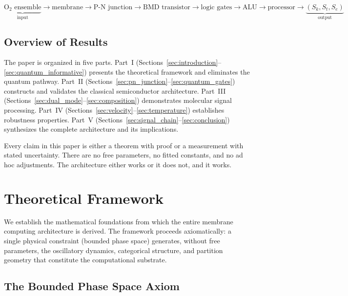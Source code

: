 \documentclass[twocolumn,10pt,a4paper]{article}
\theoremstyle{definition}
\theoremstyle{remark}
\newcommand{\Sk}{S_k}
\newcommand{\St}{S_t}
\newcommand{\Se}{S_e}
\begin{document}
\begin{equation}
\label{eq:signal_chain}
\underbrace{\text{O}_2 \text{ ensemble}}_{\text{input}} \to \text{membrane} \to \text{P-N junction} \to \text{BMD transistor} \to \text{logic gates} \to \text{ALU} \to \text{processor} \to \underbrace{(\Sk, \St, \Se)}_{\text{output}}
\end{equation}

\subsection{Overview of Results}

The paper is organized in five parts. Part~I (Sections~\ref{sec:introduction}--\ref{sec:quantum_informative}) presents the theoretical framework and eliminates the quantum pathway. Part~II (Sections~\ref{sec:pn_junction}--\ref{sec:quantum_gates}) constructs and validates the classical semiconductor architecture. Part~III (Sections~\ref{sec:dual_mode}--\ref{sec:composition}) demonstrates molecular signal processing. Part~IV (Sections~\ref{sec:velocity}--\ref{sec:temperature}) establishes robustness properties. Part~V (Sections~\ref{sec:signal_chain}--\ref{sec:conclusion}) synthesizes the complete architecture and its implications.

Every claim in this paper is either a theorem with proof or a measurement with stated uncertainty. There are no free parameters, no fitted constants, and no ad hoc adjustments. The architecture either works or it does not, and it works.


\section{Theoretical Framework}
\label{sec:theory}

We establish the mathematical foundations from which the entire membrane computing architecture is derived. The framework proceeds axiomatically: a single physical constraint (bounded phase space) generates, without free parameters, the oscillatory dynamics, categorical structure, and partition geometry that constitute the computational substrate.

\subsection{The Bounded Phase Space Axiom}
\end{document}
